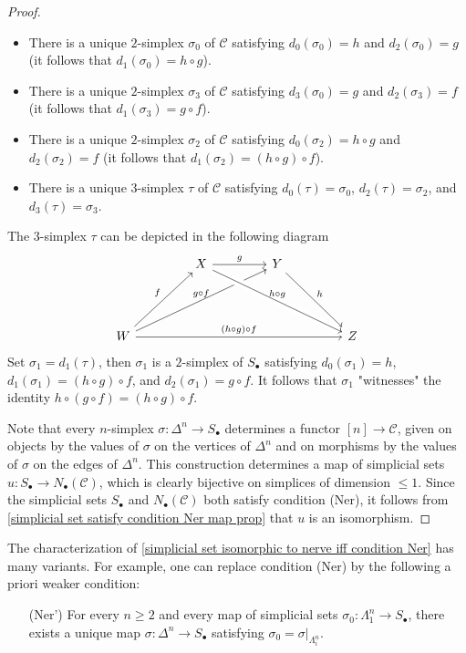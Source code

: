 \begin{proof}
\begin{itemize}
\begin{itemize}
\item There is a unique $2$-simplex $\sigma_0$ of $\mathcal{C}$ satisfying $d_0(\sigma_0)=h$ and $d_2(\sigma_0)=g$ (it follows that $d_1(\sigma_0)=h\circ g$).
\item There is a unique $2$-simplex $\sigma_3$ of $\mathcal{C}$ satisfying $d_3(\sigma_0)=g$ and $d_2(\sigma_3)=f$ (it follows that $d_1(\sigma_3)=g\circ f$).
\item There is a unique $2$-simplex $\sigma_2$ of $\mathcal{C}$ satisfying $d_0(\sigma_2)=h\circ g$ and $d_2(\sigma_2)=f$ (it follows that $d_1(\sigma_2)=(h\circ g)\circ f$).
\item There is a unique $3$-simplex $\tau$ of $\mathcal{C}$ satisfying $d_0(\tau)=\sigma_0$, $d_2(\tau)=\sigma_2$, and $d_3(\tau)=\sigma_3$.
\end{itemize}
The $3$-simplex $\tau$ can be depicted in the following diagram
\[\begin{tikzcd}[row sep=15mm,column sep=15mm]
&X\ar[r,"g"]&Y\ar[rd,"h"]&\\
W\ar[ru,"f"]\ar[rru,"g\circ f"{anchor=south}]\ar[rrr,"(h\circ g)\circ f"]&&&Z\ar[llu,crossing over,leftarrow,"h\circ g"{anchor=south}]
\end{tikzcd}\]
Set $\sigma_1=d_1(\tau)$, then $\sigma_1$ is a $2$-simplex of $S_\bullet$ satisfying $d_0(\sigma_1)=h$, $d_1(\sigma_1)=(h\circ g)\circ f$, and $d_2(\sigma_1)=g\circ f$. It follows that $\sigma_1$ "witnesses" the identity $h\circ(g\circ f)=(h\circ g)\circ f$.
\end{itemize}
Note that every $n$-simplex $\sigma:\Delta^n\to S_\bullet$ determines a functor $[n]\to\mathcal{C}$, given on objects by the values of $\sigma$ on the vertices of $\Delta^n$ and on morphisms by the values of $\sigma$ on the edges of $\Delta^n$. This construction determines a map of simplicial sets $u:S_\bullet\to N_\bullet(\mathcal{C})$, which is clearly bijective on simplices of dimension $\leq 1$. Since the simplicial sets $S_\bullet$ and $N_\bullet(\mathcal{C})$ both satisfy condition (Ner), it follows from \cref{simplicial set satisfy condition Ner map prop} that $u$ is an isomorphism.
\end{proof}
\begin{remark}
The characterization of \cref{simplicial set isomorphic to nerve iff condition Ner} has many variants. For example, one can replace condition (Ner) by the following a priori weaker condition:
\begin{enumerate}[leftmargin=40pt]
\item[(Ner')] For every $n\geq 2$ and every map of simplicial sets $\sigma_0:\Lambda^n_1\to S_\bullet$, there exists a unique map $\sigma:\Delta^n\to S_\bullet$ satisfying $\sigma_0=\sigma|_{\Lambda^n_i}$.
\end{enumerate}
\end{remark}
